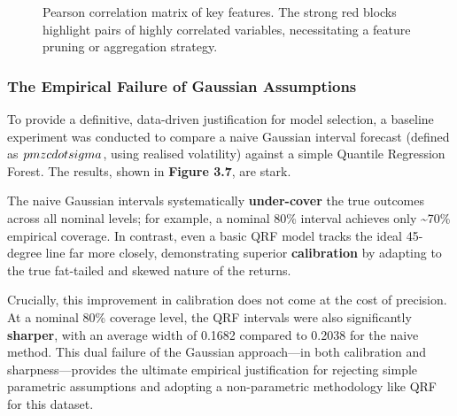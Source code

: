 \documentclass[
  a4paper,
  DIV=11,
  numbers=noendperiod]{scrreprt}
\begin{document}
\begin{figure}


\caption{\label{fig-leverage-effect}Pearson correlation matrix of key
features. The strong red blocks highlight pairs of highly correlated
variables, necessitating a feature pruning or aggregation strategy.}

\end{figure}%

\subsubsection{The Empirical Failure of Gaussian
Assumptions}\label{the-empirical-failure-of-gaussian-assumptions}

To provide a definitive, data-driven justification for model selection,
a baseline experiment was conducted to compare a naive Gaussian interval
forecast (defined as \(\\pm z \\cdot \\sigma\), using realised
volatility) against a simple Quantile Regression Forest. The results,
shown in \textbf{Figure 3.7}, are stark.

The naive Gaussian intervals systematically \textbf{under-cover} the
true outcomes across all nominal levels; for example, a nominal 80\%
interval achieves only \textasciitilde70\% empirical coverage. In
contrast, even a basic QRF model tracks the ideal 45-degree line far
more closely, demonstrating superior \textbf{calibration} by adapting to
the true fat-tailed and skewed nature of the returns.

Crucially, this improvement in calibration does not come at the cost of
precision. At a nominal 80\% coverage level, the QRF intervals were also
significantly \textbf{sharper}, with an average width of 0.1682 compared
to 0.2038 for the naive method. This dual failure of the Gaussian
approach---in both calibration and sharpness---provides the ultimate
empirical justification for rejecting simple parametric assumptions and
adopting a non-parametric methodology like QRF for this dataset.
\end{document}
